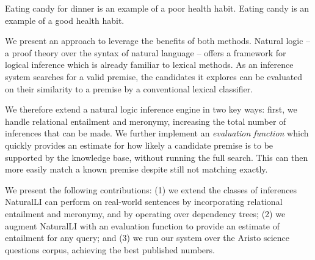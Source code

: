 \entailmentExample
{Eating candy for dinner is an example of a poor health habit.}
{Eating candy is an example of a good health habit.}

We present an approach to leverage the benefits of both methods.
Natural logic -- a proof theory over the syntax of natural language --
  offers a framework for logical inference which is already
  familiar to lexical methods.
As an inference system searches for a valid premise,
  the candidates it explores can be evaluated on their
  similarity to a premise by a conventional lexical classifier.

We therefore extend a natural logic inference engine in two key ways:
  first, we handle relational entailment 
  and meronymy, increasing the total number of inferences that can be made.
We further implement an \textit{evaluation function} which quickly
  provides an estimate for how likely a candidate premise is to be supported
  by the knowledge base, without running the full search.
This can then more easily match a known premise 
  despite still not matching exactly.

We present the following contributions:
(1) we extend the classes of inferences NaturalLI can perform on real-world 
    sentences by
    incorporating relational entailment and meronymy, and by operating over 
    dependency trees;
(2) we augment NaturalLI with an evaluation function to provide an estimate of entailment
    for any query; and 
(3) we run our system over the Aristo science questions corpus,
    achieving the best published numbers.


